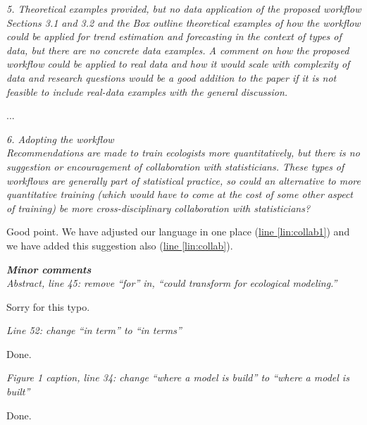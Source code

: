 \documentclass[11pt,letter]{article}
\begin{document}
\begin{mybox}
\emph{5. Theoretical examples provided, but no data application of the proposed workflow\\
Sections 3.1 and 3.2 and the Box outline theoretical examples of how the workflow could be applied for trend estimation and forecasting in the context of types of data, but there are no concrete data examples. A comment on how the proposed workflow could be applied to real data and how it would scale with complexity of data and research questions would be a good addition to the paper if it is not feasible to include real-data examples with the general discussion.}
\end{mybox}

...

\begin{mybox}
\emph{6. Adopting the workflow\\
Recommendations are made to train ecologists more quantitatively, but there is no suggestion or encouragement of collaboration with statisticians. These types of workflows are generally part of statistical practice, so could an alternative to more quantitative training (which would have to come at the cost of some other aspect of training) be more cross-disciplinary collaboration with statisticians?}
\end{mybox}

Good point. We have adjusted our language in one place (\href{file:forecastflows_r1\#lintarget:collab1}{line \ref*{lin:collab1}}) and we have added this suggestion also (\href{file:forecastflows_r1\#lintarget:collab}{line \ref*{lin:collab}}).

\begin{mybox}
\emph{\textbf{Minor comments}\\
Abstract, line 45: remove “for” in, “could transform for ecological modeling.”}
\end{mybox}

Sorry for this typo.

\begin{mybox}
\emph{Line 52: change “in term” to “in terms”}
\end{mybox}

Done.

\begin{mybox}
\emph{Figure 1 caption, line 34: change “where a model is build” to “where a model is built”}
\end{mybox}

Done.
\end{document}
